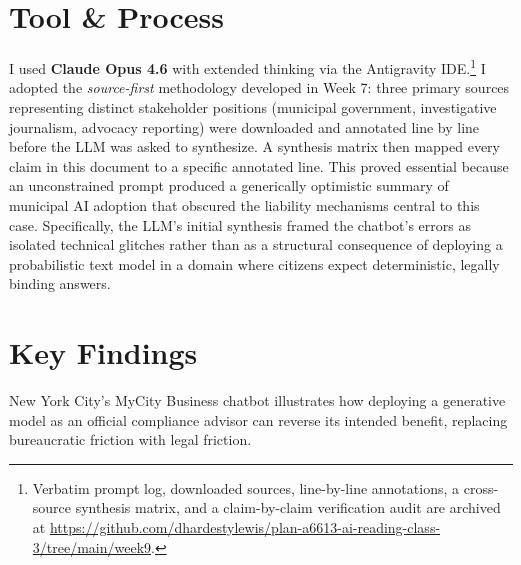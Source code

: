 \documentclass[11pt, twocolumn]{article}
\begin{document}

\section*{Tool \& Process}
I used \textbf{Claude Opus 4.6} with extended thinking via the Antigravity IDE.\footnote{Verbatim prompt log, downloaded sources, line-by-line annotations, a cross-source synthesis matrix, and a claim-by-claim verification audit are archived at \url{https://github.com/dhardestylewis/plan-a6613-ai-reading-class-3/tree/main/week9}.} I adopted the \textit{source-first} methodology developed in Week 7: three primary sources representing distinct stakeholder positions (municipal government, investigative journalism, advocacy reporting) were downloaded and annotated line by line before the LLM was asked to synthesize. A synthesis matrix then mapped every claim in this document to a specific annotated line. This proved essential because an unconstrained prompt produced a generically optimistic summary of municipal AI adoption that obscured the liability mechanisms central to this case. Specifically, the LLM's initial synthesis framed the chatbot's errors as isolated technical glitches rather than as a structural consequence of deploying a probabilistic text model in a domain where citizens expect deterministic, legally binding answers.

\section*{Key Findings}
\noindent New York City's MyCity Business chatbot illustrates how deploying a generative model as an official compliance advisor can reverse its intended benefit, replacing bureaucratic friction with legal friction.
\end{document}

